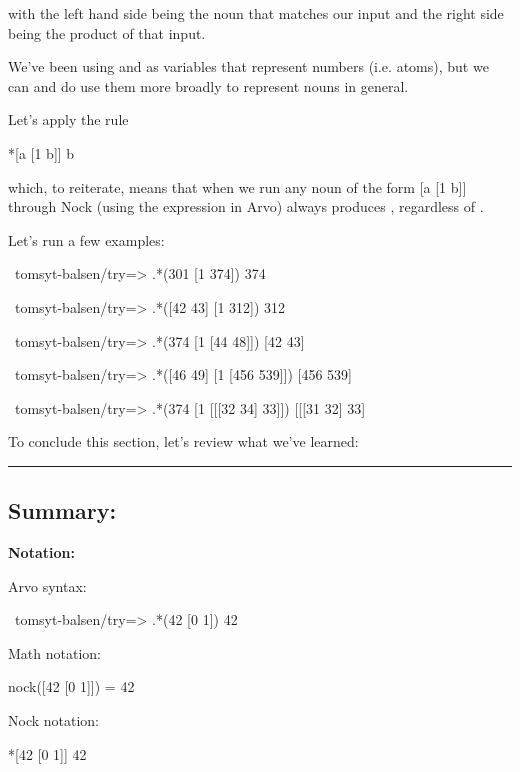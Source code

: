 with the left hand side being the noun that matches our input and the right
side being the product of that input. 

We've been using  and  as variables that represent numbers (i.e. atoms),
but we can and do use them more broadly to represent nouns in general.

Let's apply the rule

\begin{code}
*[a [1 b]]                  b
\end{code}

which, to reiterate, means that when we run any noun of the form [a [1 b]]
through Nock (using the expression  in Arvo) always produces ,
regardless of .

Let's run a few examples:

\begin{code}
~tomsyt-balsen/try=> .*(301 [1 374])
374

~tomsyt-balsen/try=> .*([42 43] [1 312])
312

~tomsyt-balsen/try=> .*(374 [1 [44 48]])
[42 43]

~tomsyt-balsen/try=> .*([46 49] [1 [456 539]])
[456 539]

~tomsyt-balsen/try=> .*(374 [1 [[[32 34] 33]])
[[[31 32] 33]
\end{code}

To conclude this section, let's review what we've learned:

\begin{center}
\rule{3in}{0.4pt}
\end{center}

\subsection{Summary:}

\textbf{Notation:}

Arvo syntax:

\begin{code}
~tomsyt-balsen/try=> .*(42 [0 1]) 
42
\end{code}

Math notation:

\begin{code}
nock([42 [0 1]]) = 42
\end{code}

Nock notation:

\begin{code}
*[42 [0 1]]                  42
\end{code}

